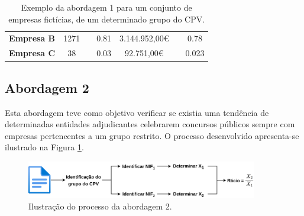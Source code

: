 \begin{table}[H]
{\begin{tabular}{ccccccc}
		\textbf{Empresa B} & 1271                                                                                                                  &                                                                                                                & 0.81           & 3.144.952,00€                                                                                               &                                                                                                & 0.78           \\
		\textbf{Empresa C} & 38                                                                                                                    &                                                                                                                & 0.03           & 92.751,00€                                                                                                  &                                                                                                & 0.023          \\ \hline
	\end{tabular}%
	}
	\caption{Exemplo da abordagem 1 para um conjunto de empresas fictícias, de um determinado grupo do CPV.}
	\label{tab:r51exemplo1}
\end{table}



\subsection{Abordagem 2}

Esta abordagem teve como objetivo verificar se existia uma tendência de determinadas entidades adjudicantes celebrarem concursos públicos sempre com empresas pertencentes a um grupo restrito. O processo desenvolvido apresenta-se ilustrado na Figura \ref{fig:ab2}. 

\begin{figure}[H]
	\centering
	\includegraphics[width=0.9\textwidth]{imagens/r51/r51_v1.png}
	\caption{Ilustração do processo da abordagem 2.}
	\label{fig:ab2}
\end{figure}

